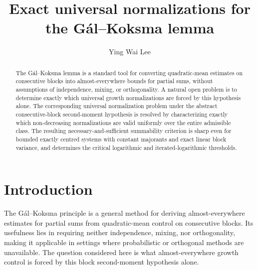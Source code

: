 \documentclass[12pt,reqno]{amsart}
\title{Exact universal normalizations for the G\'al--Koksma lemma}
\author{Ying Wai Lee}
\theoremstyle{definition}
\theoremstyle{plain}
\begin{document}
\begin{abstract}
    The G\'al--Koksma lemma is a standard tool for converting quadratic-mean estimates on consecutive blocks into almost-everywhere bounds for partial sums, without assumptions of independence, mixing, or orthogonality. A natural open problem is to determine exactly which universal growth normalizations are forced by this hypothesis alone. The corresponding universal normalization problem under the abstract consecutive-block second-moment hypothesis is resolved by characterizing exactly which non-decreasing normalizations are valid uniformly over the entire admissible class. The resulting necessary-and-sufficient summability criterion is sharp even for bounded exactly centred systems with constant majorants and exact linear block variance, and determines the critical logarithmic and iterated-logarithmic thresholds.
\end{abstract}

\maketitle

\section{Introduction}\label{sec:introduction}

The G\'al--Koksma principle is a general method for deriving almost-everywhere estimates for partial sums from quadratic-mean control on consecutive blocks. Its usefulness lies in requiring neither independence, mixing, nor orthogonality, making it applicable in settings where probabilistic or orthogonal methods are unavailable. The question considered here is what almost-everywhere growth control is forced by this block second-moment hypothesis alone.
\end{document}

